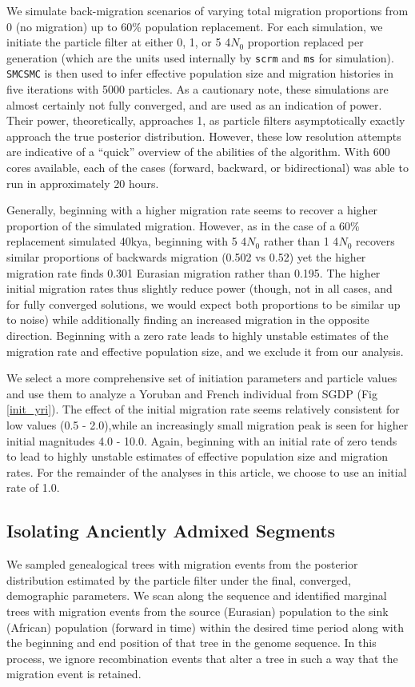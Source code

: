 We simulate back-migration scenarios of varying total migration proportions from 0 (no migration) up to 60\% population replacement. For each simulation, we initiate the particle filter at either 0, 1, or 5 4$N_0$ proportion replaced per generation (which are the units used internally by {\tt scrm} and {\tt ms} for simulation).  {\tt SMCSMC} is then used to infer effective population size and migration histories in five iterations with 5000 particles. As a cautionary note, these simulations are almost certainly not fully converged, and are used as an indication of power. Their power, theoretically, approaches 1, as particle filters asymptotically exactly approach the true posterior distribution. However, these low resolution attempts are indicative of a ``quick'' overview of the abilities of the algorithm. With 600 cores available, each of the cases (forward, backward, or bidirectional) was able to run in approximately 20 hours. 

Generally, beginning with a higher migration rate seems to recover a higher proportion of the simulated migration. However, as in the case of a 60\% replacement simulated 40kya, beginning with 5 4$N_0$ rather than 1 4$N_0$ recovers similar proportions of backwards migration (0.502 vs 0.52) yet the higher migration rate finds 0.301 Eurasian migration rather than 0.195. The higher initial migration rates thus slightly reduce power (though, not in all cases, and for fully converged solutions, we would expect both proportions to be similar up to noise) while additionally finding an increased migration in the opposite direction.  Beginning with a zero rate leads to highly unstable estimates of the migration rate and effective population size, and we exclude it from our analysis.

We select a more comprehensive set of initiation parameters and particle values and use them to analyze a Yoruban and French individual from SGDP (Fig \ref{init_yri}). The effect of the initial migration rate seems relatively consistent for low values (0.5 - 2.0),while an increasingly small migration peak is seen for higher initial magnitudes 4.0 - 10.0. Again, beginning with an initial rate of zero tends to lead to highly unstable estimates of effective population size and migration rates. For the remainder of the analyses in this article, we choose to use an initial rate of 1.0. 



\subsection{Isolating Anciently Admixed Segments} We sampled genealogical trees with migration events from the posterior distribution estimated by the particle filter under the final, converged, demographic parameters. We scan along the sequence and identified marginal trees with migration events from the source (Eurasian) population to the sink (African) population (forward in time) within the desired time period along with the beginning and end position of that tree in the genome sequence. In this process, we ignore recombination events that alter a tree in such a way that the migration event is retained.  

